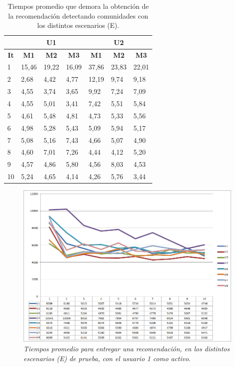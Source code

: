 \begin{table}[H]
  \begin{center}
    \caption{Tiempos promedio que demora la obtención de la recomendación detectando comunidades con los distintos escenarios (E).}
    \label{tab:res-tab04}
    \begin{tabular}{|l|l|l|l|l|l|l|}
    \hline
       & \multicolumn{3}{c|}{\textbf{U1}} & \multicolumn{3}{c|}{\textbf{U2}} \\ \hline
      \multicolumn{1}{|c|}{\textbf{It}} & \multicolumn{1}{c|}{\textbf{M1}} & \multicolumn{1}{c|}{\textbf{M2}} & \multicolumn{1}{c|}{\textbf{M3}} & \multicolumn{1}{c|}{\textbf{M1}} & \multicolumn{1}{c|}{\textbf{M2}} & \multicolumn{1}{c|}{\textbf{M3}} \\ \hline
      1 & 15,46 & 19,22 & 16,09 & 37,86 & 23,83 & 22,01 \\ \hline
      2 & 2,68 & 4,42 & 4,77 & 12,19 & 9,74 & 9,18 \\ \hline
      3 & 4,55 & 3,74 & 3,65 & 9,92 & 7,24 & 7,09 \\ \hline
      4 & 4,55 & 5,01 & 3,41 & 7,42 & 5,51 & 5,84 \\ \hline
      5 & 4,61 & 5,48 & 4,81 & 4,73 & 5,33 & 5,56 \\ \hline
      6 & 4,98 & 5,28 & 5,43 & 5,09 & 5,94 & 5,17 \\ \hline
      7 & 5,08 & 5,16 & 7,43 & 4,66 & 5,07 & 4,90 \\ \hline
      8 & 4,60 & 7,01 & 7,26 & 4,44 & 4,12 & 5,20 \\ \hline
      9 & 4,57 & 4,86 & 5,80 & 4,56 & 8,03 & 4,53 \\ \hline
      10 & 5,24 & 4,65 & 4,14 & 4,26 & 5,76 & 3,44 \\ \hline
    \end{tabular}
  \end{center}
\end{table}


\begin{figure}[H]
  \centering
  \includegraphics[scale=.7]{images/Figura5-8}
  \caption{\em Tiempos promedio para entregar una recomendación, en los distintos escenarios (E) de prueba, con el usuario 1 como activo.}
  \label{fig:exp-im8}
\end{figure}

